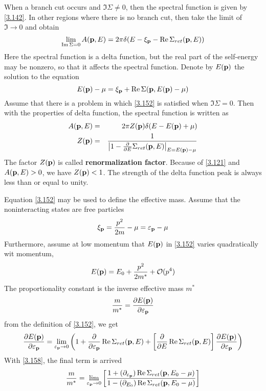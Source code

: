 When a branch cut occurs and $\Im\Sigma \neq 0$, then the spectral function is given by \eqref{3.142}.
In other regions where there is no branch cut, then take the limit of $\Im\to 0$ and obtain
\begin{equation}
  \lim_{\Im\Sigma=0}A(\mathbf{p},E)=2\pi \delta(E-\xi_{\mathbf{p}}-\Re\Sigma_{ret}(\mathbf{p},E))   \label{3.151}
\end{equation}
Here the spectral function is a delta function, but the real part of the self-energy may be nonzero, so that it affects the spectral function.
Denote by $E(\mathbf{p})$ the solution to the equation
\begin{equation}
  E(\mathbf{p}) -\mu = \xi_{\mathbf{p}} + \Re\Sigma(\mathbf{p},E(\mathbf{p})-\mu) \label{3.152}
\end{equation}
Assume that there is a problem in which \eqref{3.152} is satisfied when $\Im\Sigma=0$.
Then with the properties of delta function, the spectral function is written as
\begin{eqnarray}
  A(\mathbf{p},E)&=&2\pi Z(\mathbf{p}) \delta(E-E(\mathbf{p})+\mu) \label{3.154} \\
  Z(\mathbf{p})&=&\frac{1}{\abs{1- \frac{\partial}{\partial E} \Sigma_{ret}(\mathbf{p},E)}_{E=E(\mathbf{p})-\mu}}  \label{3.155}
\end{eqnarray}
The factor $Z(\mathbf{p})$ is called \textbf{renormalization factor}.
Because of \eqref{3.121} and $A(\mathbf{p},E)>0$, we have $Z(\mathbf{p})<1$.
The strength of the delta function peak is always less than or equal to unity.

Equation \eqref{3.152} may be used to define the effective mass. Assume that the noninteracting states are free particles
\begin{equation}
  \xi_{\mathbf{p}} = \frac{p^2}{2m} -\mu = \varepsilon_{\mathbf{p}} -\mu  \label{3.156}
\end{equation}
Furthermore, assume at low momentum that $E(\mathbf{p})$ in \eqref{3.152} varies quadratically wit momentum,
\begin{equation}
  E(\mathbf{p}) = E_0 + \frac{p^2}{2m^*} +\mathcal{O}(p^4)  \label{3.157}
\end{equation}
The proportionality constant is the inverse effective mass $m^*$
\begin{equation}
  \frac{m}{m^*} = \frac{\partial E(\mathbf{p})}{\partial \varepsilon_{\mathbf{p}}}  \label{3.158}
\end{equation}
from the definition of \eqref{3.152}, we get
\begin{equation}
  \frac{\partial E(\mathbf{p})}{\partial \varepsilon_{\mathbf{p}}} = \lim_{\varepsilon_{\mathbf{p}} \to 0} \left(1 + \frac{\partial}{\partial \varepsilon_{\mathbf{p}}} \Re\Sigma_{ret}(\mathbf{p},E) + \left[ \frac{\partial}{\partial E}\Re\Sigma_{ret}(\mathbf{p},E) \right] \frac{\partial E(\mathbf{p}) }{\partial \varepsilon_{\mathbf{p}}} \right)  \label{3.159}
\end{equation}
With \eqref{3.158}, the final term is arrived
\begin{equation}
  \frac{m}{m^*} = \lim_{\varepsilon_{\mathbf{p}} \to 0} \left[ \frac{1 + (\partial_{\varepsilon_{\mathbf{p}}}) \Re \Sigma_{ret}(\mathbf{p},E_0-\mu)}{1 - (\partial_{E_0}) \Re \Sigma_{ret}(\mathbf{p},E_0-\mu)}\right]  \label{3.160}
\end{equation}

